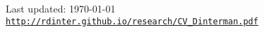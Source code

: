 \documentclass[letterpaper]{article}
\def\footerlink{http://rdinter.github.io/research/CV_Dinterman.pdf}
\renewenvironment{itemize}{
  \begin{list}{}{
    \setlength{\leftmargin}{1.5em}
  }
}{
  \end{list}
}
\begin{document}

\bigskip

\begin{center}
  \begin{footnotesize}
    Last updated: \today \\
    \href{\footerlink}{\texttt{http://rdinter.github.io/research/CV\_Dinterman.pdf}}
  \end{footnotesize}
\end{center}
\end{document}
